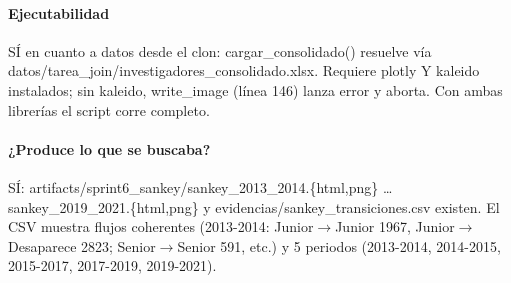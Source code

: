 \paragraph{Ejecutabilidad}
SÍ en cuanto a datos desde el clon: cargar\_consolidado() resuelve vía datos/tarea\_join/investigadores\_consolidado.xlsx. Requiere plotly Y kaleido instalados; sin kaleido, write\_image (línea 146) lanza error y aborta. Con ambas librerías el script corre completo.

\paragraph{¿Produce lo que se buscaba?}
SÍ: artifacts/sprint6\_sankey/sankey\_2013\_2014.\{html,png\} \dots{} sankey\_2019\_2021.\{html,png\} y evidencias/sankey\_transiciones.csv existen. El CSV muestra flujos coherentes (2013-2014: Junior$\rightarrow$Junior 1967, Junior$\rightarrow$Desaparece 2823; Senior$\rightarrow$Senior 591, etc.) y 5 periodos (2013-2014, 2014-2015, 2015-2017, 2017-2019, 2019-2021).

